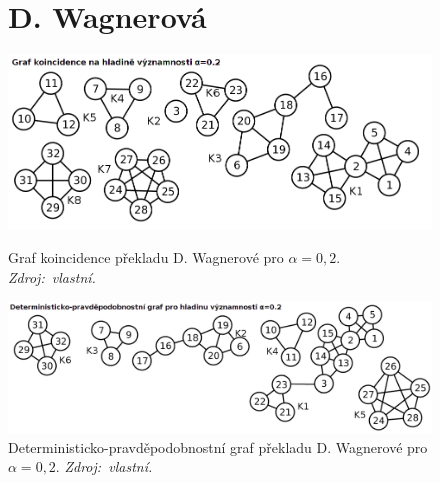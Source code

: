 \documentclass[dp.tex]{subfiles}
\begin{document}
\begin{figure}[h]
\section*{D. Wagnerová}
	\centering
	\includegraphics[max width=\textwidth,keepaspectratio=true]{imgs-99-priloha-d/i_k_20}
	\caption[Graf koincidence překladu D. Wagnerové pro $\alpha = 0{,}2$]
            {Graf koincidence překladu D. Wagnerové pro $\alpha = 0{,}2$. \textit{Zdroj:~vlastní.}}
	\label{fig:i_k_20}

	\includegraphics[max width=\textwidth,keepaspectratio=true]{imgs-99-priloha-d/i_d_20}
	\caption[Deterministicko-pravděpodobnostní graf překladu D. Wagnerové pro $\alpha = 0{,}2$]
            {Deterministicko-pravděpodobnostní graf překladu D. Wagnerové pro $\alpha = 0{,}2$. \textit{Zdroj:~vlastní.}}
	\label{fig:i_d_20}
\end{figure}
\end{document}

